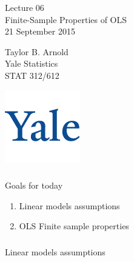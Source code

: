



\begin{frame}[fragile] \frametitle{}

\vfill

{\fontsize{0.7cm}{0cm}\selectfont Lecture 06 \\\vspace{0.2cm}
Finite-Sample Properties of OLS}\\\vspace{0.5cm}
21 September 2015

\vspace{2cm}

\begin{minipage}{0.6\textwidth}
Taylor B. Arnold \\
Yale Statistics \\
STAT 312/612
\end{minipage}
\hfill
\begin{minipage}{0.3\textwidth}\raggedleft
\includegraphics[scale=0.3]{../yale-logo.png}
\end{minipage}%

\end{frame}

\begin{frame}[fragile] \frametitle{}

{\color{yaleblue}\fontsize{16pt}{20pt}\selectfont Goals for today}

\begin{enumerate}
\item Linear models assumptions
\item OLS Finite sample properties
\end{enumerate}

\end{frame}

\begin{frame}[fragile] \frametitle{}

\begin{flushright}
{\color{yaleblue}\sc\fontsize{1cm}{0cm}\selectfont Linear models assumptions}
\end{flushright}

\end{frame}

